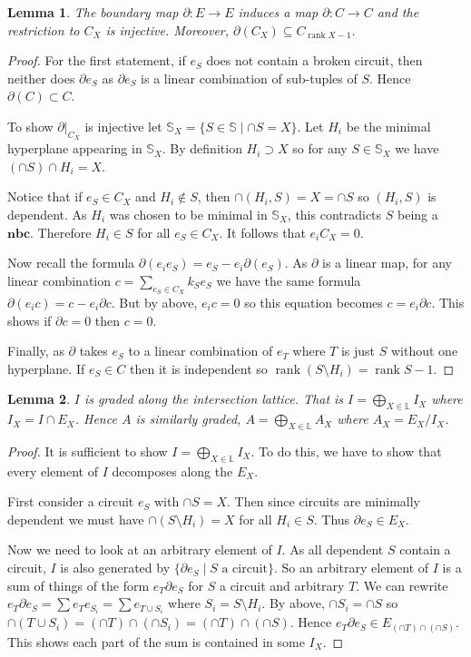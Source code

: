\documentclass[article,twoside]{article}
\newcommand{\BB}[1]{\mathbb{#1}}
\newcommand{\rk}{\operatorname{rank}}
\newcommand{\tuples}{\BB{S}}
\newcommand{\lattice}{\BB{L}}
\newcommand{\NBC}{$\textbf{nbc}$}
\theoremstyle{plain}
\theoremstyle{plain}
\newtheorem{lemma}[lemma]{Lemma}
\theoremstyle{plain}
\theoremstyle{plain}
\theoremstyle{plain}
\theoremstyle{definition}
\theoremstyle{definition}
\theoremstyle{definition}
\theoremstyle{remark}
\theoremstyle{remark}
\begin{document}
\begin{lemma}\label{lemma_del_C_to_C_injective}
	The boundary map $\partial:E\to E$ induces a map $\partial:C\to C$ and the restriction to $C_X$ is injective. Moreover, $\partial(C_X)\subseteq C_{\rk X-1}$.
\end{lemma}
\begin{proof}
	For the first statement, if $e_S$ does not contain a broken circuit, then neither does $\partial e_S$ as $\partial e_S$ is a linear combination of sub-tuples of $S$. Hence $\partial(C)\subset C$.

	To show $\partial|_{C_X}$ is injective let $\tuples_X = \{S\in\tuples \mid \cap S = X\}$. Let $H_i$ be the minimal hyperplane appearing in $\tuples_X$. By definition $H_i\supset X$ so for any $S\in \tuples_X$ we have $(\cap S) \cap H_i = X$. 
	
	Notice that if $e_S\in C_X$ and $H_i\notin S$, then $\cap (H_i,S)=X=\cap S$ so $(H_i,S)$ is dependent. As $H_i$ was chosen to be minimal in $\tuples_X$, this contradicts $S$ being a \NBC. Therefore $H_i\in S$ for all $e_S\in C_X$. It follows that $e_iC_X = 0$.
	
	Now recall the formula $\partial(e_ie_S)  = e_S - e_i\partial(e_S)$. As $\partial$ is a linear map, for any linear combination $c = \sum_{e_S\in C_X}k_S e_S$ we have the same formula $\partial(e_ic)=c-e_i\partial c$. But by above, $e_ic=0$ so this equation becomes $c = e_i\partial c$. This shows if $\partial c=0$ then $c=0$.
	
	Finally, as $\partial$ takes $e_S$ to a linear combination of $e_T$ where $T$ is just $S$ without one hyperplane. If $e_S\in C$ then it is independent so $\rk (S\setminus H_i) = \rk S-1$.
\end{proof}

\begin{lemma}\label{lemma_A_grading_flats}
	$I$ is graded along the intersection lattice. That is $I = \bigoplus_{X\in\lattice}I_X$ where $I_X = I\cap E_X$. Hence $A$ is similarly graded, $A = \bigoplus_{X\in\lattice}A_X$ where $A_X = E_X/I_X$.
\end{lemma}
\begin{proof}
	It is sufficient to show $I = \bigoplus_{X\in\lattice} I_X$. To do this, we have to show that every element of $I$ decomposes along the $E_X$.
	
	First consider a circuit $e_S$ with $\cap S = X$. Then since circuits are minimally dependent we must have $\cap (S\setminus H_i)=X$ for all $H_i\in S$. Thus $\partial e_S\in E_X$.
	
	Now we need to look at an arbitrary element of $I$. As all dependent $S$ contain a circuit, $I$ is also generated by $\{\partial e_S \mid S \text{ a circuit}\}$. So an arbitrary element of $I$ is a sum of things of the form $e_T\partial e_S$ for $S$ a circuit and arbitrary $T$. We can rewrite $e_T\partial e_S = \sum e_Te_{S_i} = \sum e_{T\cup S_i}$ where $S_i = S\setminus H_i$. By above, $\cap S_i = \cap S$ so $\cap(T\cup S_i) = (\cap T)\cap (\cap S_i) = (\cap T)\cap (\cap S)$. Hence $e_T\partial e_S \in E_{(\cap T)\cap (\cap S)}$. This shows each part of the sum is contained in some $I_X$.
\end{proof}
\end{document}
